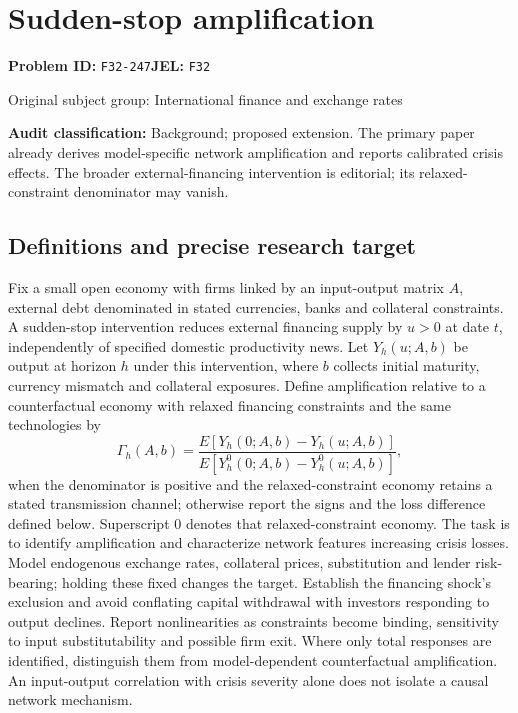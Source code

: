 \documentclass[11pt,a4paper]{article}
\begin{document}
\section*{Sudden-stop amplification}
\textbf{Problem ID:} \texttt{F32-247}\quad \textbf{JEL:} \texttt{F32}\par
\label{problem:OP-0336}
{\sffamily\small\color{muted}Original subject group: International finance and exchange rates\par}
\label{definitions:problem:30007618}
\textbf{Audit classification:} Background; proposed extension. The primary paper already derives model-specific network amplification and reports calibrated crisis effects. The broader external-financing intervention is editorial; its relaxed-constraint denominator may vanish.
\subsection*{Definitions and precise research target}
Fix a small open economy with firms linked by an input-output matrix \(A\), external debt denominated in stated currencies, banks and collateral constraints. A sudden-stop intervention reduces external financing supply by \(u>0\) at date \(t\), independently of specified domestic productivity news. Let \(Y_h(u;A,b)\) be output at horizon \(h\) under this intervention, where \(b\) collects initial maturity, currency mismatch and collateral exposures. Define amplification relative to a counterfactual economy with relaxed financing constraints and the same technologies by
\[\Gamma_h(A,b)=\frac{E[Y_h(0;A,b)-Y_h(u;A,b)]}{E[Y_h^0(0;A,b)-Y_h^0(u;A,b)]},\]
when the denominator is positive and the relaxed-constraint economy retains a stated transmission channel; otherwise report the signs and the loss difference defined below. Superscript \(0\) denotes that relaxed-constraint economy. The task is to identify amplification and characterize network features increasing crisis losses. Model endogenous exchange rates, collateral prices, substitution and lender risk-bearing; holding these fixed changes the target. Establish the financing shock's exclusion and avoid conflating capital withdrawal with investors responding to output declines. Report nonlinearities as constraints become binding, sensitivity to input substitutability and possible firm exit. Where only total responses are identified, distinguish them from model-dependent counterfactual amplification. An input-output correlation with crisis severity alone does not isolate a causal network mechanism.
\end{document}
